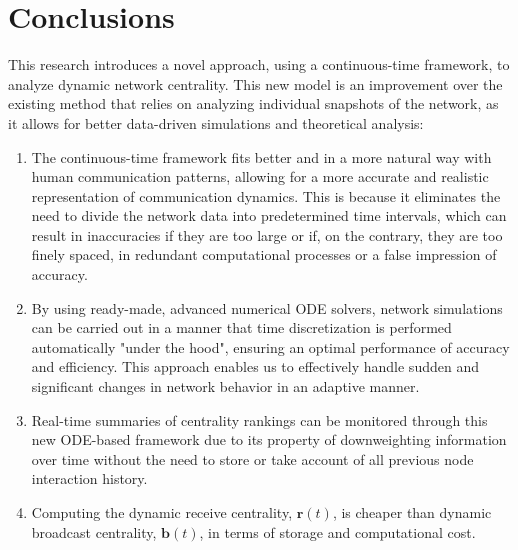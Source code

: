 
\chapter{Conclusions}
\label{chap:concl}

This research introduces a novel approach, using a continuous-time framework, to analyze dynamic network centrality. This new model is an improvement over the existing method that relies on analyzing individual snapshots of the network, as it allows for better data-driven simulations and theoretical analysis:

\begin{enumerate}[label=(\roman*)]
  \item The continuous-time framework fits better and in a more natural way with human communication patterns, allowing for a more accurate and realistic representation of communication dynamics. This is because it eliminates the need to divide the network data into predetermined time intervals, which can result in inaccuracies if they are too large or if, on the contrary, they are too finely spaced, in redundant computational processes or a false impression of accuracy.
  \item By using ready-made, advanced numerical ODE solvers, network simulations can be carried out in a manner that time discretization is performed automatically "under the hood", ensuring an optimal performance of accuracy and efficiency. This approach enables us to effectively handle sudden and significant changes in network behavior in an adaptive manner.
  \item Real-time summaries of centrality rankings can be monitored through this new ODE-based framework due to its property of downweighting information over time without the need to store or take account of all previous node interaction history.
  \item Computing the dynamic receive centrality, $\mathbf{r}(t)$, is cheaper than dynamic broadcast centrality, $\mathbf{b}(t)$, in terms of storage and computational cost.
\end{enumerate}






